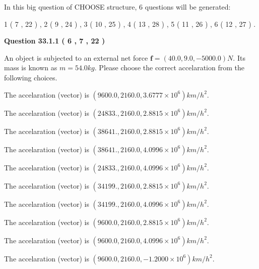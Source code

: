 \documentclass[12pt]{article}
\begin{document}
   
\vspace{0.2in}
   
 In this big question of CHOOSE structure,            6  questions will be generated: 
  
  
             1 (           7 ,          22 )
 ,
             2 (           9 ,          24 )
 ,
             3 (          10 ,          25 )
 ,
             4 (          13 ,          28 )
 ,
             5 (          11 ,          26 )
 ,
             6 (          12 ,          27 )
 .
  
\vspace{0.2in}
  
{\textbf{\Large{Question
33.1.1 
 (           6 ,           7 ,          22 )
}}}
  
  
 
An object is subjected to an external net force $\mathbf{f}=(
40.0 ,
9.0,
-5000.0  )N$. Its mass is known as
$m= %
54.0  kg$. Please choose the correct accelaration
from the following choices.
 
 
 
The accelaration (vector) is
$(
9600.0,
2160.0 ,
3.6777 \times 10^{6}
)km/h^2.
$
 
 
The accelaration (vector) is
$(
24833.,
2160.0 ,
2.8815 \times 10^{6}
)km/h^2.
$
 
 
The accelaration (vector) is
$(
38641.,
2160.0 ,
2.8815 \times 10^{6}
)km/h^2.
$
 
 
The accelaration (vector) is
$(
38641.,
2160.0 ,
4.0996 \times 10^{6}
)km/h^2.
$
 
 
The accelaration (vector) is
$(
24833.,
2160.0 ,
4.0996 \times 10^{6}
)km/h^2.
$
 
 
The accelaration (vector) is
$(
34199.,
2160.0 ,
2.8815 \times 10^{6}
)km/h^2.
$
 
 
The accelaration (vector) is
$(
34199.,
2160.0 ,
4.0996 \times 10^{6}
)km/h^2.
$
 
 
The accelaration (vector) is
$(
9600.0,
2160.0 ,
2.8815 \times 10^{6}
)km/h^2.
$
 
 
The accelaration (vector) is
$(
9600.0,
2160.0 ,
4.0996 \times 10^{6}
)km/h^2.
$
 
 
The accelaration (vector) is
$(
9600.0,
2160.0 ,
-1.2000 \times 10^{6}
)km/h^2.
$
 
\end{document}
